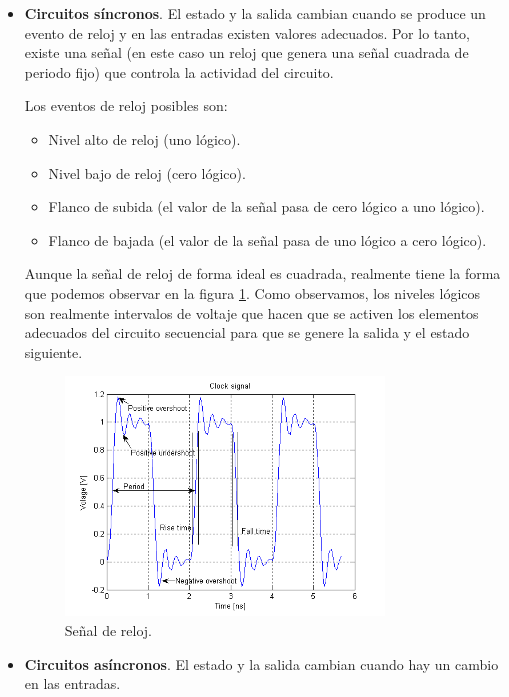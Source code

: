 \documentclass[a4paper, 11pt, titlepage]{article}
\begin{document}
	\begin{itemize}
		\item \textbf{Circuitos síncronos}. El estado y la salida cambian cuando se produce un evento de reloj
		y en las entradas existen valores adecuados. Por lo tanto, existe una señal (en este caso un reloj que 
		genera una señal cuadrada de periodo fijo) que controla la actividad del circuito.

		Los eventos de reloj posibles son:

		\begin{itemize}
			\item Nivel alto de reloj (uno lógico).
			\item Nivel bajo de reloj (cero lógico).
			\item Flanco de subida (el valor de la señal pasa de cero lógico a uno lógico).
			\item Flanco de bajada (el valor de la señal pasa de uno lógico a cero lógico).
		\end{itemize}

		Aunque la señal de reloj de forma ideal es cuadrada, realmente tiene la forma que podemos observar 
		en la figura \ref{clocksignal}. Como observamos, los niveles lógicos son realmente intervalos de 
		voltaje que hacen que se activen los elementos adecuados del circuito secuencial para que se genere 
		la salida y el estado siguiente.

		\begin{figure}[htp]
			\centering
			\includegraphics[width=0.8\textwidth]{resources/clocksignal.png}
			\caption{Señal de reloj.}
			\label{clocksignal}
		\end{figure}
	

		\item \textbf{Circuitos asíncronos}. El estado y la salida cambian cuando hay un cambio en las entradas.
	\end{itemize}
\end{document}

